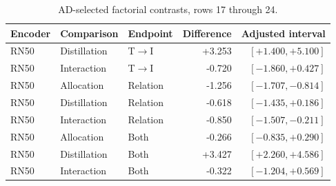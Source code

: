 \begin{table}[t]
\centering
\small
\setlength{\tabcolsep}{3pt}
\begin{tabular}{lllrr}
\toprule
Encoder & Comparison & Endpoint & Difference & Adjusted interval\\
\midrule
RN50 & Distillation & T$\to$I & +3.253 & $[+1.400,+5.100]$ \\
RN50 & Interaction & T$\to$I & -0.720 & $[-1.860,+0.427]$ \\
RN50 & Allocation & Relation & -1.256 & $[-1.707,-0.814]$ \\
RN50 & Distillation & Relation & -0.618 & $[-1.435,+0.186]$ \\
RN50 & Interaction & Relation & -0.850 & $[-1.507,-0.211]$ \\
RN50 & Allocation & Both & -0.266 & $[-0.835,+0.290]$ \\
RN50 & Distillation & Both & +3.427 & $[+2.260,+4.586]$ \\
RN50 & Interaction & Both & -0.322 & $[-1.204,+0.569]$ \\
\bottomrule
\end{tabular}
\caption{AD-selected factorial contrasts, rows 17 through 24.}\label{tab:adfactorial16}
\end{table}


